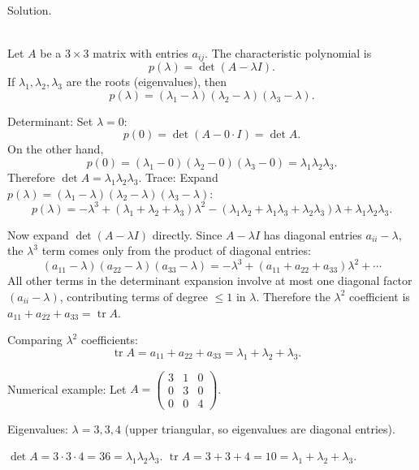 \documentclass{article}
\begin{document}
\noindent\\
\textnormal{Solution.}\\
\quad\\
\begin{mdframed}[linewidth=1pt]
Let $A$ be a $3 \times 3$ matrix with entries $a_{ij}$. The characteristic polynomial is
\[
p(\lambda) = \det(A - \lambda I).
\]
If $\lambda_1, \lambda_2, \lambda_3$ are the roots (eigenvalues), then
\[
p(\lambda) = (\lambda_1 - \lambda)(\lambda_2 - \lambda)(\lambda_3 - \lambda).
\]

\medskip
\textnormal{Determinant:} Set $\lambda = 0$:
\[
p(0) = \det(A - 0 \cdot I) = \det A.
\]
On the other hand,
\[
p(0) = (\lambda_1 - 0)(\lambda_2 - 0)(\lambda_3 - 0) = \lambda_1 \lambda_2 \lambda_3.
\]
Therefore $\det A = \lambda_1 \lambda_2 \lambda_3$.
\medskip
\textnormal{Trace:} Expand $p(\lambda) = (\lambda_1 - \lambda)(\lambda_2 - \lambda)(\lambda_3 - \lambda)$:
\[
p(\lambda) = -\lambda^3 + (\lambda_1 + \lambda_2 + \lambda_3)\lambda^2 - (\lambda_1\lambda_2 + \lambda_1\lambda_3 + \lambda_2\lambda_3)\lambda + \lambda_1\lambda_2\lambda_3.
\]

Now expand $\det(A - \lambda I)$ directly. Since $A - \lambda I$ has diagonal entries $a_{ii} - \lambda$, the $\lambda^3$ term comes only from the product of diagonal entries:
\[
(a_{11} - \lambda)(a_{22} - \lambda)(a_{33} - \lambda) = -\lambda^3 + (a_{11} + a_{22} + a_{33})\lambda^2 + \cdots
\]
All other terms in the determinant expansion involve at most one diagonal factor $(a_{ii} - \lambda)$, contributing terms of degree $\le 1$ in $\lambda$. Therefore the $\lambda^2$ coefficient is $a_{11} + a_{22} + a_{33} = \operatorname{tr} A$.

Comparing $\lambda^2$ coefficients:
\[
\operatorname{tr} A = a_{11} + a_{22} + a_{33} = \lambda_1 + \lambda_2 + \lambda_3. \quad\]

\medskip
\textnormal{Numerical example:} Let $A = \begin{pmatrix} 3 & 1 & 0 \\ 0 & 3 & 0 \\ 0 & 0 & 4 \end{pmatrix}$.

Eigenvalues: $\lambda = 3, 3, 4$ (upper triangular, so eigenvalues are diagonal entries).

$\det A = 3 \cdot 3 \cdot 4 = 36 = \lambda_1\lambda_2\lambda_3$.
$\operatorname{tr} A = 3 + 3 + 4 = 10 = \lambda_1 + \lambda_2 + \lambda_3$.\end{mdframed}
\end{document}
